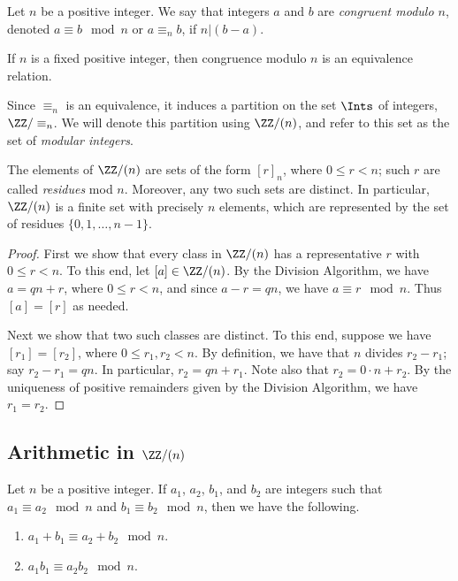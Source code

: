 \documentclass{article}
\begin{document}

\begin{dfn}
Let $n$ be a positive integer. We say that integers $a$ and $b$ are \emph{congruent modulo $n$}, denoted $a \equiv b \mod n$ or $a \equiv_n b$, if $n|(b-a)$.
\end{dfn}

\begin{prop}
If $n$ is a fixed positive integer, then congruence modulo $n$ is an equivalence relation. 
\end{prop}

Since $\equiv_n$ is an equivalence, it induces a partition on the set $\Ints$ of integers, $\ZZ/\equiv_n$. We will denote this partition using $\ZZ/(n)$, and refer to this set as the set of \emph{modular integers}.

\begin{thm}
The elements of $\ZZ/(n)$ are sets of the form $[r]_n$, where $0 \leq r < n$; such $r$ are called \emph{residues} mod $n$. Moreover, any two such sets are distinct. In particular, $\ZZ/(n)$ is a finite set with precisely $n$ elements, which are represented by the set of residues $\{0,1,\ldots,n-1\}$. 
\end{thm}

\begin{proof}
First we show that every class in $\ZZ/(n)$ has a representative $r$ with $0 \leq r < n$. To this end, let $[a] \in \ZZ/(n)$. By the Division Algorithm, we have $a = qn + r$, where $0 \leq r < n$, and since $a - r = qn$, we have $a \equiv r \mod n$. Thus $[a] = [r]$ as needed.

Next we show that two such classes are distinct. To this end, suppose we have $[r_1] = [r_2]$, where $0 \leq r_1, r_2 < n$. By definition, we have that $n$ divides $r_2 - r_1$; say $r_2 - r_1 = qn$. In particular, $r_2 = qn + r_1$. Note also that $r_2 = 0 \cdot n + r_2$. By the uniqueness of positive remainders given by the Division Algorithm, we have $r_1 = r_2$.
\end{proof}



\subsection*{Arithmetic in $\ZZ/(n)$}

\begin{thm}
Let $n$ be a positive integer. If $a_1$, $a_2$, $b_1$, and $b_2$ are integers such that $a_1 \equiv a_2 \mod n$ and $b_1 \equiv b_2 \mod n$, then we have the following.
\begin{enumerate}
\item $a_1 + b_1 \equiv a_2 + b_2 \mod n$.
\item $a_1 b_1 \equiv a_2 b_2 \mod n$.
\end{enumerate}
\end{thm}
\end{document}
